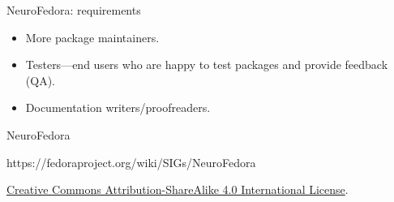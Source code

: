 \begin{frame}[c]{NeuroFedora: requirements}
  \begin{itemize}
    \item More package maintainers\footnotemark.
      \pause{}
    \item Testers---end users who are happy to test packages and provide feedback (QA)\footnotemark.
      \pause{}
    \item Documentation writers/proofreaders.
  \end{itemize}
\end{frame}
\begin{frame}[c]{NeuroFedora}
  \begin{center}
    https://fedoraproject.org/wiki/SIGs/NeuroFedora\vspace{0.2cm}

    \href{http://creativecommons.org/licenses/by-sa/4.0/}{Creative Commons Attribution-ShareAlike 4.0 International License}.\vspace{0.2cm}

    \ccbysa{}
  \end{center}
\end{frame}


